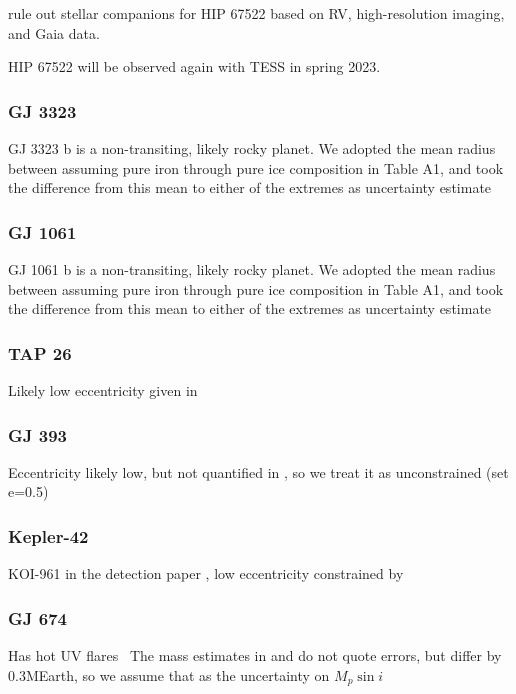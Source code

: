 \documentclass[twocolumn]{aastex631}
\begin{document}
\cite{wood2021characterizing} rule out stellar companions for HIP 67522 based on RV, high-resolution imaging, and Gaia data.

HIP 67522 will be observed again with TESS in spring 2023.
\subsubsection{GJ 3323}

GJ 3323 b is a non-transiting, likely rocky planet. We adopted the mean radius between assuming pure iron through pure ice composition in \cite{lovos2022null} Table A1, and took the difference from this mean to either of the extremes as uncertainty estimate

\subsubsection{GJ 1061}
GJ 1061 b is a non-transiting, likely rocky planet. We adopted the mean radius between assuming pure iron through pure ice composition in \cite{lovos2022null} Table A1, and took the difference from this mean to either of the extremes as uncertainty estimate

\subsubsection{TAP 26}
Likely low eccentricity given in \cite{yu2017hot}

\subsubsection{GJ 393}
Eccentricity likely low, but not quantified in \cite{amado2021carmenes}, so we treat it as unconstrained (set e=0.5)

\subsubsection{Kepler-42}
 	KOI-961 in the detection paper \cite{muirhead2012characterizing}, low eccentricity constrained by \cite{mann2017gold}

\subsubsection{GJ 674}
Has hot UV flares~\cite{froning2019hot}
The mass estimates in \cite{bonfils2007harps} and \cite{boisse2011disentangling} do not quote errors, but differ by 0.3MEarth, so we assume that as the uncertainty on $M_p\sin i$
\end{document}
